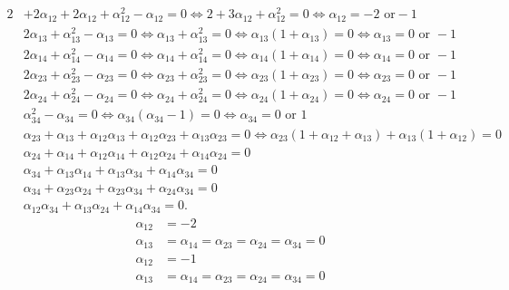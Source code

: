 \documentclass[aps,preprint]{revtex4}%
\begin{document}
\begin{align}
2  &  +2\alpha_{12}+2\alpha_{12}+\alpha_{12}^{2}-\alpha_{12}=0\Leftrightarrow
2+3\alpha_{12}+\alpha_{12}^{2}=0\Leftrightarrow\alpha_{12}=-2\text{ or
}-1\nonumber\\
&  2\alpha_{13}+\alpha_{13}^{2}-\alpha_{13}=0\Leftrightarrow\alpha_{13}%
+\alpha_{13}^{2}=0\Leftrightarrow\alpha_{13}\left(  1+\alpha_{13}\right)
=0\Leftrightarrow\alpha_{13}=0\text{ or }-1\nonumber\\
&  2\alpha_{14}+\alpha_{14}^{2}-\alpha_{14}=0\Leftrightarrow\alpha_{14}%
+\alpha_{14}^{2}=0\Leftrightarrow\alpha_{14}\left(  1+\alpha_{14}\right)
=0\Leftrightarrow\alpha_{14}=0\text{ or }-1\nonumber\\
&  2\alpha_{23}+\alpha_{23}^{2}-\alpha_{23}=0\Leftrightarrow\alpha_{23}%
+\alpha_{23}^{2}=0\Leftrightarrow\alpha_{23}\left(  1+\alpha_{23}\right)
=0\Leftrightarrow\alpha_{23}=0\text{ or }-1\nonumber\\
&  2\alpha_{24}+\alpha_{24}^{2}-\alpha_{24}=0\Leftrightarrow\alpha_{24}%
+\alpha_{24}^{2}=0\Leftrightarrow\alpha_{24}\left(  1+\alpha_{24}\right)
=0\Leftrightarrow\alpha_{24}=0\text{ or }-1\nonumber\\
&  \alpha_{34}^{2}-\alpha_{34}=0\Leftrightarrow\alpha_{34}\left(  \alpha
_{34}-1\right)  =0\Leftrightarrow\alpha_{34}=0\text{ or }1\nonumber\\
&  \alpha_{23}+\alpha_{13}+\alpha_{12}\alpha_{13}+\alpha_{12}\alpha
_{23}+\alpha_{13}\alpha_{23}=0\Leftrightarrow\alpha_{23}\left(  1+\alpha
_{12}+\alpha_{13}\right)  +\alpha_{13}\left(  1+\alpha_{12}\right)
=0\nonumber\\
&  \alpha_{24}+\alpha_{14}+\alpha_{12}\alpha_{14}+\alpha_{12}\alpha
_{24}+\alpha_{14}\alpha_{24}=0\nonumber\\
&  \alpha_{34}+\alpha_{13}\alpha_{14}+\alpha_{13}\alpha_{34}+\alpha_{14}%
\alpha_{34}=0\nonumber\\
&  \alpha_{34}+\alpha_{23}\alpha_{24}+\alpha_{23}\alpha_{34}+\alpha_{24}%
\alpha_{34}=0\nonumber\\
&  \alpha_{12}\alpha_{34}+\alpha_{13}\alpha_{24}+\alpha_{14}\alpha_{34}=0.
\end{align}%
\begin{align}
\alpha_{12}  &  =-2\\
\alpha_{13}  &  =\alpha_{14}=\alpha_{23}=\alpha_{24}=\alpha_{34}=0
\end{align}%
\begin{align}
\alpha_{12}  &  =-1\\
\alpha_{13}  &  =\alpha_{14}=\alpha_{23}=\alpha_{24}=\alpha_{34}=0
\end{align}%
\end{document}
